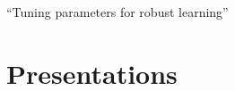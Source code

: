\documentclass[10pt]{article}
\begin{document}
	\hspace{1em}``Tuning parameters for robust learning''
	
	\smallskip 
	
	
	

	
	
	
	\smallskip

	
	
%	
%	
%	
	
	\section*{Presentations}
	\vspace{-2.5em}
	
\end{document}
